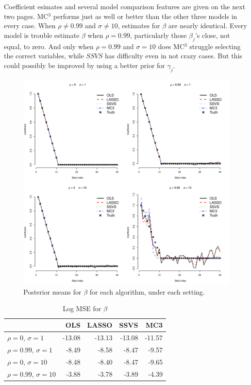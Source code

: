 \documentclass[12pt]{article}
\begin{document}
Coefficient esimates and several model comparison features are given on the next two pages. MC$^3$ performs just as well or better than the other three models in every case. When $\rho\neq 0.99$ and $\sigma\neq 10$, estimates for $\beta$ are nearly identical. Every model is trouble estimate $\beta$ when $\rho=0.99$, particularly those $\beta_j$'s close, not equal, to zero. And only when $\rho=0.99$ and $\sigma=10$ does MC$^3$ struggle selecting the correct variables, while $SSVS$ has difficulty even in not crazy cases. But this could possibly be improved by using a better prior for $\gamma_j$.

\begin{figure}[H]
\begin{center}
\includegraphics[scale=0.5]{../figs/four_estimates.pdf}
\end{center}
\caption{Posterior means for $\beta$ for each algorithm, under each setting.}
\end{figure}

\begin{table}[H]
\centering
\begin{tabular}{lrrrr}
  \hline\hline
 & OLS & LASSO & SSVS & MC3 \\ 
  \hline
$\rho=0$, $\sigma=1$     & -13.08 & -13.13 & -13.08 & -11.57 \\ 
$\rho=0.99$, $\sigma=1$  & -8.49 & -8.58 & -8.47 & -9.57 \\ 
$\rho=0$, $\sigma=10$    & -8.48 & -8.40 & -8.47 & -9.65 \\ 
$\rho=0.99$, $\sigma=10$ & -3.88 & -3.78 & -3.89 & -4.39 \\ 
   \hline\hline
\end{tabular}
\caption{Log MSE for $\beta$}
\end{table}
\end{document}
